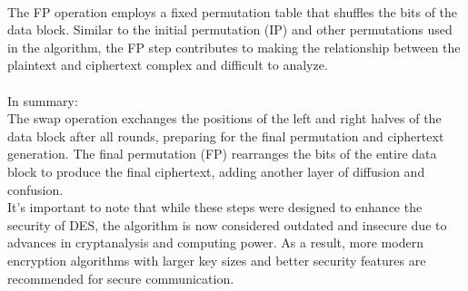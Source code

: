 \documentclass{report}
\begin{document}
\\
The FP operation employs a fixed permutation table that shuffles the bits of the data block. Similar to the initial permutation (IP) and other permutations used in the algorithm, the FP step contributes to making the relationship between the plaintext and ciphertext complex and difficult to analyze.\\
\\
In summary:\\
The swap operation exchanges the positions of the left and right halves of the data block after all rounds, preparing for the final permutation and ciphertext generation.
The final permutation (FP) rearranges the bits of the entire data block to produce the final ciphertext, adding another layer of diffusion and confusion.\\
It's important to note that while these steps were designed to enhance the security of DES, the algorithm is now considered outdated and insecure due to advances in cryptanalysis and computing power. As a result, more modern encryption algorithms with larger key sizes and better security features are recommended for secure communication.
\end{document}
